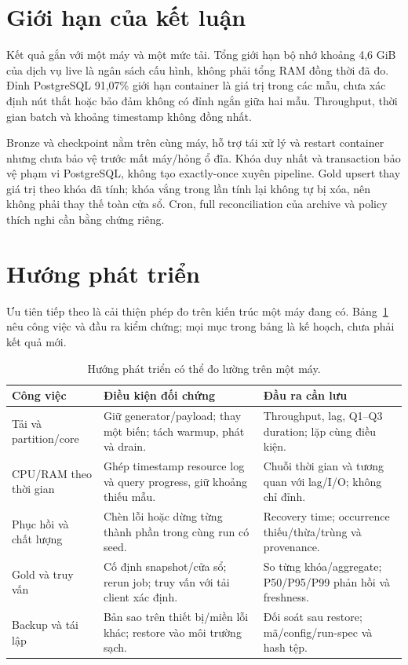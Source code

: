 \section{Giới hạn của kết luận}

Kết quả gắn với một máy và một mức tải. Tổng giới hạn bộ nhớ khoảng
4,6 GiB của dịch vụ live là ngân sách cấu hình, không phải tổng RAM đồng
thời đã đo. Đỉnh PostgreSQL 91,07\% giới hạn container là giá trị trong
các mẫu, chưa xác định nút thắt hoặc bảo đảm không có đỉnh ngắn giữa hai
mẫu. Throughput, thời gian batch và khoảng timestamp không đồng nhất.

Bronze và checkpoint nằm trên cùng máy, hỗ trợ tái xử lý và restart
container nhưng chưa bảo vệ trước mất máy/hỏng ổ đĩa. Khóa duy nhất và
transaction bảo vệ phạm vi PostgreSQL, không tạo exactly-once xuyên
pipeline. Gold upsert thay giá trị theo khóa đã tính; khóa vắng trong
lần tính lại không tự bị xóa, nên không phải thay thế toàn cửa sổ.
Cron, full reconciliation của archive và policy thích nghi cần bằng
chứng riêng.

\section{Hướng phát triển}

Ưu tiên tiếp theo là cải thiện phép đo trên kiến trúc một máy đang có.
Bảng~\ref{tab:single-node-roadmap} nêu công việc và đầu ra kiểm chứng; mọi
mục trong bảng là kế hoạch, chưa phải kết quả mới.

\begin{table}[H]
\centering
\caption{Hướng phát triển có thể đo lường trên một máy.}
\label{tab:single-node-roadmap}
\small
\begin{tabularx}{\textwidth}{>{\raggedright\arraybackslash}p{3.1cm} *{2}{>{\raggedright\arraybackslash}X}}
\toprule
\textbf{Công việc} & \textbf{Điều kiện đối chứng} & \textbf{Đầu ra cần lưu} \\
\midrule
Tải và partition/core & Giữ generator/payload; thay một biến; tách warmup, phát và drain. & Throughput, lag, Q1--Q3 duration; lặp cùng điều kiện. \\
CPU/RAM theo thời gian & Ghép timestamp resource log và query progress, giữ khoảng thiếu mẫu. & Chuỗi thời gian và tương quan với lag/I/O; không chỉ đỉnh. \\
Phục hồi và chất lượng & Chèn lỗi hoặc dừng từng thành phần trong cùng run có seed. & Recovery time; occurrence thiếu/thừa/trùng và provenance. \\
Gold và truy vấn & Cố định snapshot/cửa sổ; rerun job; truy vấn với tải client xác định. & So từng khóa/aggregate; P50/P95/P99 phản hồi và freshness. \\
Backup và tái lập & Bản sao trên thiết bị/miền lỗi khác; restore vào môi trường sạch. & Đối soát sau restore; mã/config/run-spec và hash tệp. \\
\bottomrule
\end{tabularx}
\end{table}

